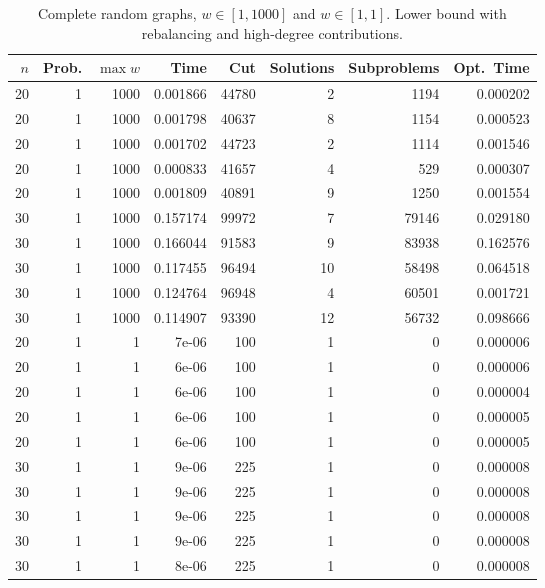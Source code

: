 \documentclass[a4paper,11pt]{article}
\begin{document}
\begin{table}
\begin{center}
\begin{tabular}{|rrr|r|r|rr|r|}
\hline
$n$ & Prob. & $\max w$ & Time & Cut & Solutions & Subproblems & Opt.\ Time \\
\hline
20 & 1 & 1000 & 0.001866 & 44780 & 2 & 1194 & 0.000202 \\
20 & 1 & 1000 & 0.001798 & 40637 & 8 & 1154 & 0.000523 \\
20 & 1 & 1000 & 0.001702 & 44723 & 2 & 1114 & 0.001546 \\
20 & 1 & 1000 & 0.000833 & 41657 & 4 & 529 & 0.000307 \\
20 & 1 & 1000 & 0.001809 & 40891 & 9 & 1250 & 0.001554 \\
30 & 1 & 1000 & 0.157174 & 99972 & 7 & 79146 & 0.029180 \\
30 & 1 & 1000 & 0.166044 & 91583 & 9 & 83938 & 0.162576 \\
30 & 1 & 1000 & 0.117455 & 96494 & 10 & 58498 & 0.064518 \\
30 & 1 & 1000 & 0.124764 & 96948 & 4 & 60501 & 0.001721 \\
30 & 1 & 1000 & 0.114907 & 93390 & 12 & 56732 & 0.098666 \\
\hline
20 & 1 & 1 & 7e-06 & 100 & 1 & 0 & 0.000006 \\
20 & 1 & 1 & 6e-06 & 100 & 1 & 0 & 0.000006 \\
20 & 1 & 1 & 6e-06 & 100 & 1 & 0 & 0.000004 \\
20 & 1 & 1 & 6e-06 & 100 & 1 & 0 & 0.000005 \\
20 & 1 & 1 & 6e-06 & 100 & 1 & 0 & 0.000005 \\
30 & 1 & 1 & 9e-06 & 225 & 1 & 0 & 0.000008 \\
30 & 1 & 1 & 9e-06 & 225 & 1 & 0 & 0.000008 \\
30 & 1 & 1 & 9e-06 & 225 & 1 & 0 & 0.000008 \\
30 & 1 & 1 & 9e-06 & 225 & 1 & 0 & 0.000008 \\
30 & 1 & 1 & 8e-06 & 225 & 1 & 0 & 0.000008 \\
\hline
\end{tabular}
\end{center}
\caption{Complete random graphs, $w\in[1,1000]$ and $w\in[1,1]$. Lower
  bound with rebalancing and high-degree contributions.}
\label{tab:complete-highdegree}
\end{table}
\end{document}
